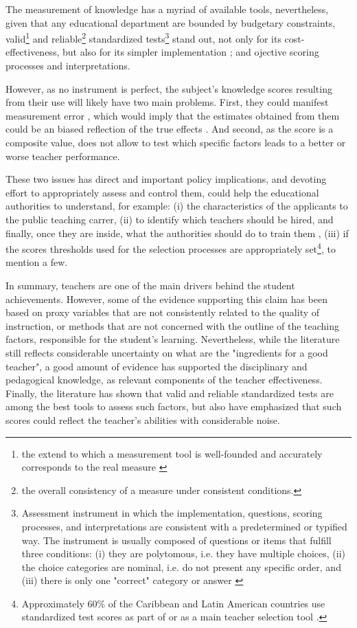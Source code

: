 The measurement of knowledge has a myriad of available tools, nevertheless, given that any educational department are bounded by budgetary constraints, valid\footnote{the extend to which a measurement tool is well-founded and accurately corresponds to the real measure \cite{Kelley_1927}} and reliable\footnote{the overall consistency of a measure under consistent conditions.} standardized tests\footnote{Assessment instrument in which the implementation, questions, scoring processes, and interpretations are consistent with a predetermined or typified way. The instrument is usually composed of questions or items that fulfill three conditions: (i) they are polytomous, i.e. they have multiple choices, (ii) the choice categories are nominal, i.e. do not present any specific order, and (iii) there is only one "correct" category or answer \cite{Rivera_2019}} stand out, not only for its cost-effectiveness, but also for its simpler implementation \cite{Hincapie_et_al_2020}; and ojective scoring processes and interpretations.

However, as no instrument is perfect, the subject's knowledge scores resulting  from their use will likely have two main problems. First, they could manifest measurement error \cite{Metzler_et_al_2012}, which would imply that the estimates obtained from them could be an biased reflection of the true effects \cite{Angrist_et_al_1999}. And second, as the score is a composite value, does not allow to test which specific factors leads to a better or worse teacher performance.

These two issues has direct and important policy implications, and devoting effort to appropriately assess and control them, could help the educational authorities to understand, for example: (i) the characteristics of the applicants to the public teaching carrer, (ii) to identify which teachers should be hired, and finally, once they are inside, what the authorities should do to train them \cite{Hanushek_et_al_2012}, (iii) if the scores thresholds used for the selection processes are appropriately set\footnote{Approximately 60\% of the Caribbean and Latin American countries use standardized test scores as part of or as a main teacher selection tool \cite{Hincapie_et_al_2020}.}, to mention a few.



In summary, teachers are one of the main drivers behind the student achievements. However, some of the evidence supporting this claim has been based on proxy variables that are not consistently related to the quality of instruction, or methods that are not concerned with the outline of the teaching factors, responsible for the student's learning. Nevertheless, while the literature still reflects considerable uncertainty on what are the "ingredients for a good teacher", a good amount of evidence has supported the disciplinary and pedagogical knowledge, as relevant components of the teacher effectiveness. Finally, the literature has shown that valid and reliable standardized tests are among the best tools to assess such factors, but also have emphasized that such scores could reflect the teacher's abilities with considerable noise.

